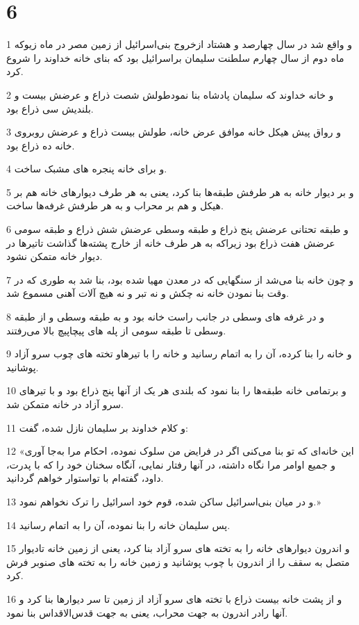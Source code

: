 \chapter{6}

\par 1 و واقع شد در سال چهارصد و هشتاد ازخروج بنی‌اسرائیل از زمین مصر در ماه زیوکه ماه دوم از سال چهارم سلطنت سلیمان براسرائیل بود که بنای خانه خداوند را شروع کرد.
\par 2 و خانه خداوند که سلیمان پادشاه بنا نمودطولش شصت ذراع و عرضش بیست و بلندیش سی ذراع بود.
\par 3 و رواق پیش هیکل خانه موافق عرض خانه، طولش بیست ذراع و عرضش روبروی خانه ده ذراع بود.
\par 4 و برای خانه پنجره های مشبک ساخت.
\par 5 و بر دیوار خانه به هر طرفش طبقه‌ها بنا کرد، یعنی به هر طرف دیوارهای خانه هم بر هیکل و هم بر محراب و به هر طرفش غرفه‌ها ساخت.
\par 6 و طبقه تحتانی عرضش پنج ذراع و طبقه وسطی عرضش شش ذراع و طبقه سومی عرضش هفت ذراع بود زیراکه به هر طرف خانه از خارج پشته‌ها گذاشت تاتیرها در دیوار خانه متمکن نشود.
\par 7 و چون خانه بنا می‌شد از سنگهایی که در معدن مهیا شده بود، بنا شد به طوری که در وقت بنا نمودن خانه نه چکش و نه تبر و نه هیچ آلات آهنی مسموع شد.
\par 8 و در غرفه های وسطی در جانب راست خانه بود و به طبقه وسطی و از طبقه وسطی تا طبقه سومی از پله های پیچاپیچ بالا می‌رفتند.
\par 9 و خانه را بنا کرده، آن را به اتمام رسانید و خانه را با تیرهاو تخته های چوب سرو آزاد پوشانید.
\par 10 و برتمامی خانه طبقه‌ها را بنا نمود که بلندی هر یک از آنها پنج ذراع بود و با تیرهای سرو آزاد در خانه متمکن شد.
\par 11 و کلام خداوند بر سلیمان نازل شده، گفت:
\par 12 «این خانه‌ای که تو بنا می‌کنی اگر در فرایض من سلوک نموده، احکام مرا به‌جا آوری و جمیع اوامر مرا نگاه داشته، در آنها رفتار نمایی، آنگاه سخنان خود را که با پدرت، داود، گفته‌ام با تواستوار خواهم گردانید.
\par 13 و در میان بنی‌اسرائیل ساکن شده، قوم خود اسرائیل را ترک نخواهم نمود.»
\par 14 پس سلیمان خانه را بنا نموده، آن را به اتمام رسانید.
\par 15 و اندرون دیوارهای خانه را به تخته های سرو آزاد بنا کرد، یعنی از زمین خانه تادیوار متصل به سقف را از اندرون با چوب پوشانید و زمین خانه را به تخته های صنوبر فرش کرد.
\par 16 و از پشت خانه بیست ذراع با تخته های سرو آزاد از زمین تا سر دیوارها بنا کرد و آنها رادر اندرون به جهت محراب، یعنی به جهت قدس‌الاقداس بنا نمود.
